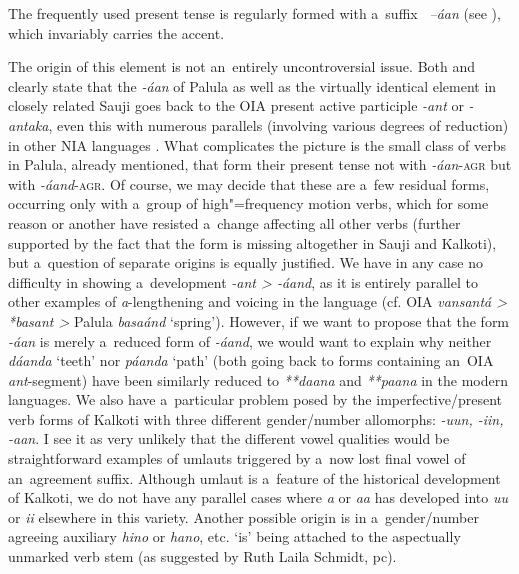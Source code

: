  The frequently used present tense is regularly formed with a~suffix
\textit{~--áan} (see ), which invariably carries the accent.


The origin of this element is not an~entirely uncontroversial issue. Both \citet[22]{morgenstierne1941} and \citet[48]{buddruss1967} clearly state that the \textit{-áan} of Palula as well as the virtually identical element in closely related Sauji goes back to the OIA present active participle \textit{-ant} or \textit{-antaka}, even this with numerous parallels (involving various degrees of reduction) in other NIA languages \citep[270--271]{masica1991}. What complicates the picture is the small class of verbs in Palula, already mentioned, that form their present tense not with \textit{-áan}-\textsc{agr} but with \textit{-áand}-\textsc{agr}. Of course, we may decide that these are a~few residual forms, occurring only with a~group of high"=frequency motion verbs, which for some reason or another have resisted a~change affecting all other verbs (further supported by the fact that the form is missing altogether in Sauji and Kalkoti), but a~question of separate origins is equally justified. We have in any case no difficulty in showing a~development \textit{-ant {\textgreater} -áand}, as it is entirely parallel to other examples of \textit{a}-lengthening and voicing in the language (cf. OIA \textit{vansantá {\textgreater} *basant {\textgreater}} Palula \textit{basaánd} `spring'). However, if we want to propose that the form \textit{-áan} is merely a~reduced form of \textit{-áand}, we would want to explain why neither \textit{dáanda} `teeth' nor \textit{páanda} `path' (both going back to forms containing an~OIA \textit{ant}-segment) have been similarly reduced to \textit{**daana} and \textit{**paana} in the modern languages. We also have a~particular problem posed by the imperfective/present verb forms of Kalkoti with three different gender/number allomorphs: \textit{-uun, -iin, -aan}. I see it as very unlikely that the different vowel qualities would be straightforward examples of umlauts triggered by a~now lost final vowel of an~agreement suffix. Although umlaut is a~feature of the historical development of Kalkoti, we do not have any parallel cases where \textit{‌a‌} or \textit{‌aa‌} has developed into \textit{‌uu‌} or \textit{‌ii‌} elsewhere in this variety. Another possible origin is in a~gender/number agreeing auxiliary \textit{hino} or \textit{hano}, etc. `is' being attached to the aspectually unmarked verb stem (as suggested by Ruth Laila Schmidt, pc). 



